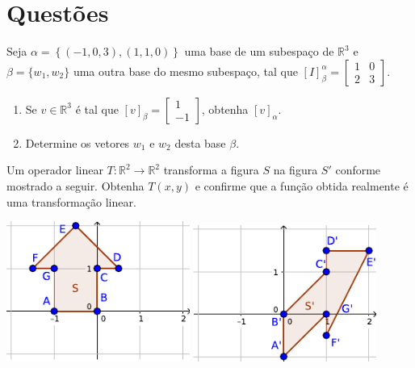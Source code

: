\documentclass[12pt,a4paper]{article}
\newcommand{\fixme}{{\color{red}(...)}}
\newcommand*\R{\mathbb{R}}
\begin{document}
\section*{Questões}
\begin{ExerciseList}
\Exercise[title={2,5}] Seja $\alpha = \left\{ (-1, 0
, 3), (1,1,0) \right\}$ uma base de um subespaço de $\R^3$ e $\beta = \{w_1, w_2\}$ uma outra base do mesmo subespaço, tal que $[I]^\alpha_\beta = \begin{bmatrix}
1 & 0 \\ 2 & 3
\end{bmatrix}$.
\begin{enumerate}
\item Se $v \in \R^3$ é tal que $[v]_\beta = \begin{bmatrix}
1 \\ -1
\end{bmatrix}$, obtenha $[v]_\alpha$.
\item Determine os vetores $w_1$ e $w_2$ desta base $\beta$.
\end{enumerate}
\Answer \fixme

\Exercise[title={2,5}] Um operador linear $T:\R^2 \to \R^2$ transforma a figura $S$ na figura $S'$ conforme mostrado a seguir. Obtenha $T(x,y)$ e confirme que a função obtida realmente é uma transformação linear.
\begin{center}
\includegraphics[width=6.0cm]{img/prova-3-nex-plano-1}
\hspace{1cm}
\includegraphics[width=6.0cm]{img/prova-3-nex-plano-2}
\end{center}
\Answer \fixme


\end{ExerciseList}
\end{document}
